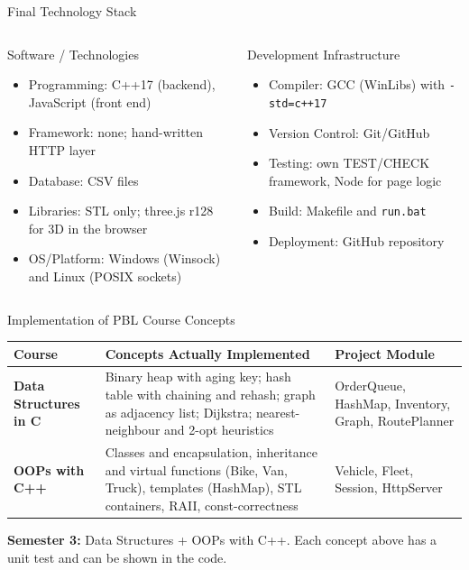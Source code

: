 \documentclass[aspectratio=169,11pt]{beamer}
\begin{document}
\begin{frame}{Final Technology Stack}
\footnotesize
\begin{columns}[T,totalwidth=\textwidth]
\begin{block}{Software / Technologies}
\begin{itemize}\itemsep2pt
    \item Programming: C++17 (backend), JavaScript (front end)
    \item Framework: none; hand-written HTTP layer
    \item Database: CSV files
    \item Libraries: STL only; three.js r128 for 3D in the browser
    \item OS/Platform: Windows (Winsock) and Linux (POSIX sockets)
\end{itemize}
\end{block}
\begin{block}{Development Infrastructure}
\begin{itemize}\itemsep2pt
    \item Compiler: GCC (WinLibs) with \texttt{-std=c++17}
    \item Version Control: Git/GitHub
    \item Testing: own TEST/CHECK framework, Node for page logic
    \item Build: Makefile and \texttt{run.bat}
    \item Deployment: GitHub repository
\end{itemize}
\end{block}
\end{columns}
\vfill
\end{frame}

\begin{frame}{Implementation of PBL Course Concepts}
\scriptsize
\begin{center}
\renewcommand{\arraystretch}{1.25}
\begin{tabularx}{.96\textwidth}{@{}>{\bfseries}p{2.8cm}X p{2.8cm}@{}}
\toprule
Course & Concepts Actually Implemented & Project Module\\
\midrule
Data Structures in C &
Binary heap with aging key; hash table with chaining and rehash; graph as adjacency list; Dijkstra; nearest-neighbour and 2-opt heuristics &
OrderQueue, HashMap, Inventory, Graph, RoutePlanner\\
OOPs with C++ &
Classes and encapsulation, inheritance and virtual functions (Bike, Van, Truck), templates (HashMap), STL containers, RAII, const-correctness &
Vehicle, Fleet, Session, HttpServer\\
\bottomrule
\end{tabularx}
\end{center}
\vfill
\begin{center}
\colorbox{GEULightBlue}{\parbox{.88\textwidth}{\centering
\textbf{Semester 3:} Data Structures + OOPs with C++. Each concept above has a unit test and can be shown in the code.}}
\end{center}
\end{frame}
\end{document}
